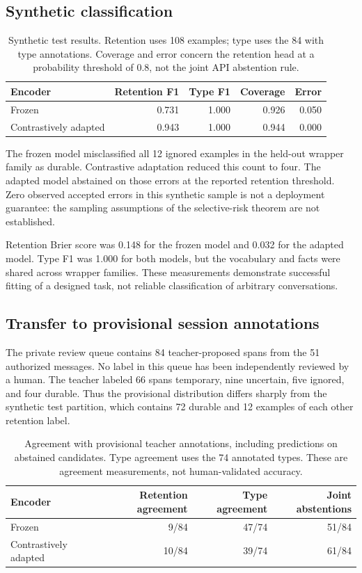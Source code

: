 \subsection{Synthetic classification}
\begin{table}[htbp]
\centering
\begin{tabular}{lrrrr}
\toprule
Encoder & Retention F1 & Type F1 & Coverage & Error\\
\midrule
Frozen & 0.731 & 1.000 & 0.926 & 0.050\\
Contrastively adapted & 0.943 & 1.000 & 0.944 & 0.000\\
\bottomrule
\end{tabular}
\caption{Synthetic test results. Retention uses 108 examples; type uses the 84 with type annotations. Coverage and error concern the retention head at a probability threshold of 0.8, not the joint API abstention rule.}
\label{tab:classification}
\end{table}

The frozen model misclassified all 12 ignored examples in the held-out wrapper family as durable. Contrastive adaptation reduced this count to four. The adapted model abstained on those errors at the reported retention threshold. Zero observed accepted errors in this synthetic sample is not a deployment guarantee: the sampling assumptions of the selective-risk theorem are not established.

Retention Brier score was 0.148 for the frozen model and 0.032 for the adapted model. Type F1 was 1.000 for both models, but the vocabulary and facts were shared across wrapper families. These measurements demonstrate successful fitting of a designed task, not reliable classification of arbitrary conversations.

\subsection{Transfer to provisional session annotations}
The private review queue contains 84 teacher-proposed spans from the 51 authorized messages. No label in this queue has been independently reviewed by a human. The teacher labeled 66 spans temporary, nine uncertain, five ignored, and four durable. Thus the provisional distribution differs sharply from the synthetic test partition, which contains 72 durable and 12 examples of each other retention label.

\begin{table}[htbp]
\centering
\begin{tabular}{lrrr}
\toprule
Encoder & Retention agreement & Type agreement & Joint abstentions\\
\midrule
Frozen & 9/84 & 47/74 & 51/84\\
Contrastively adapted & 10/84 & 39/74 & 61/84\\
\bottomrule
\end{tabular}
\caption{Agreement with provisional teacher annotations, including predictions on abstained candidates. Type agreement uses the 74 annotated types. These are agreement measurements, not human-validated accuracy.}
\label{tab:transfer}
\end{table}

